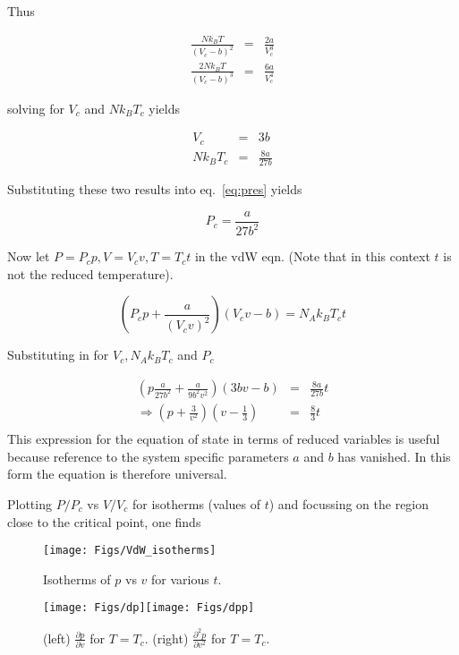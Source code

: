 \documentclass[a4paper,12pt,twoside]{article}
\begin{document}
\begin{enumerate}
Thus

\begin{eqnarray*}
\frac{Nk_BT}{(V_c-b)^2} &=& \frac{2a}{V_c^3}\\
\frac{2Nk_BT}{(V_c-b)^3} &=& \frac{6a}{V_c^4}
\end{eqnarray*}

solving for $V_c$ and $Nk_BT_c$ yields

\begin{eqnarray*}
V_c &=& 3b\\
Nk_BT_c &=& \frac{8a}{27b}
\end{eqnarray*}

Substituting these two results into eq.~\ref{eq:pres} yields 

\[
P_c=\frac{a}{27b^2}
\]

Now let $P=P_c p, V=V_cv, T=T_ct$ in the vdW eqn. (Note that in this
context $t$ is not the reduced temperature).

\[
\left(P_cp+\frac{a}{(V_cv)^2}\right)(V_cv-b)=N_Ak_BT_ct
\]

Substituting in for $V_c, N_Ak_BT_c$ and $P_c$

\begin{eqnarray*}
\left(p\frac{a}{27b^2}+\frac{a}{9b^2v^2}\right)\left(3bv-b\right)&=&\frac{8a}{27b}t\\
\Rightarrow\left(p+\frac{3}{v^2}\right)\left(v-\frac{1}{3}\right)&=&\frac{8}{3}t\\
\end{eqnarray*}
This expression for the equation of state in terms of reduced variables
is useful because reference to the system specific parameters $a$ and
$b$ has vanished. In this form the equation is therefore universal. 

Plotting $P/P_c$ vs $V/V_c$ for isotherms (values of $t$) and focussing
on the region close to the critical point, one finds

\begin{figure}[h]
\centerline{\texttt{[image: Figs/VdW\_isotherms]}}
\caption{Isotherms of $p$ vs $v$ for various $t$.}
\end{figure}


\begin{figure}[h]
\centerline{\texttt{[image: Figs/dp]}\texttt{[image: Figs/dpp]}}
\caption{(left) $\frac{\partial p}{\partial v}$ for $T=T_c$.
(right) $\frac{\partial^2 p}{\partial v^2}$ for $T=T_c$.}
\end{figure}


\end{enumerate}
\end{document}
